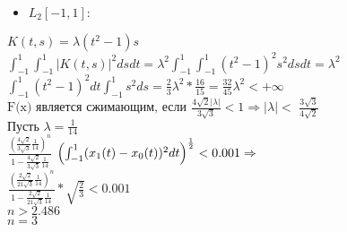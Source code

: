 \documentclass[oneside, final, 11pt]{article}
\begin{document}
  \begin{itemize}
    \item $L_2[-1,1]:$ \\
  \end{itemize}
  $K(t,s) = \lambda(t^2-1)s $\\
  $\int_{-1}^1 \int_{-1}^1 \left|K(t,s)\right|^2 ds dt = \lambda^2 \int_{-1}^1 \int_{-1}^1 (t^2-1)^2 s^2 ds dt = \lambda^2$ $\int_{-1}^1 (t^2-1)^2 dt \int_{-1}^1 s^2 ds = \frac{2}{3}\lambda^2*\frac{16}{15} = \frac{32}{45}\lambda^2 < + \infty $\\
  $\text{F(x) является сжимающим, если }_{} \frac{4\sqrt{2}|\lambda|}{3\sqrt{3}} < 1 \Rightarrow |\lambda| <$ $\frac{3\sqrt{3}}{4\sqrt{2}} $\\
  $\text{Пусть }\lambda = \frac{1}{14}$ \\
  $_{}\frac{\left(\frac{4\sqrt{2}}{3\sqrt{3}}\frac{1}{14}\right)^n}{1-\frac{4\sqrt{2}}{3\sqrt{3}}\frac{1}{14}}$ $\left(\int_{-1}^1(x_1(t)-x_0(t))^2dt\right)^{1\over2} < 0.001 \Rightarrow$\\
  $_{}\frac{\left(\frac{2\sqrt{2}}{21\sqrt{3}}\frac{1}{14}\right)^n}{1-\frac{2\sqrt{2}}{21\sqrt{3}}\frac{1}{14}}*\sqrt{\frac{2}{3}} < 0.001 $\\
  $n > 2.486 $\\
  $n = 3 $\\
\end{document}
